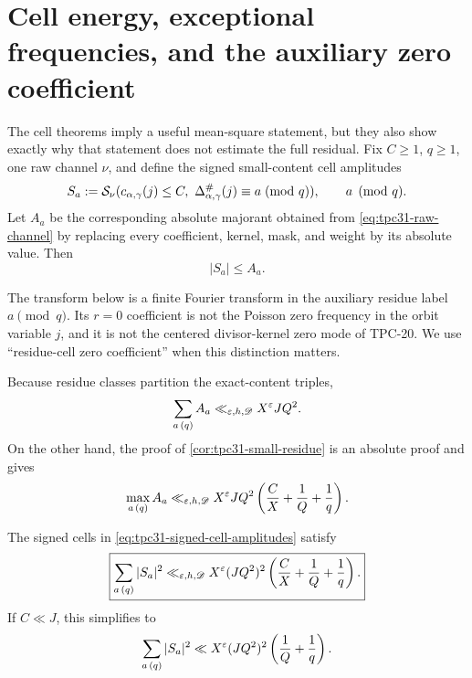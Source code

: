 \section{Cell energy, exceptional frequencies, and the auxiliary zero coefficient}
\label{sec:tpc31-zero-mode}

The cell theorems imply a useful mean-square statement, but they also
show exactly why that statement does not estimate the full residual.
Fix $C\ge1$, $q\ge1$, one raw channel $\nu$, and define the signed
small-content cell amplitudes
\begin{equation}
 S_a
 :=\mathcal S_\nu(c_{\alpha,\gamma}(j)\le C,
             \ \Delta^\#_{\alpha,\gamma}(j)
                  \equiv a\!\pmod q),
 \qquad a\pmod q.
 \label{eq:tpc31-signed-cell-amplitudes}
\end{equation}
Let $A_a$ be the corresponding absolute majorant obtained from
\eqref{eq:tpc31-raw-channel} by replacing every coefficient, kernel,
mask, and weight by its absolute value.  Then
\begin{equation}
 |S_a|\le A_a.
 \label{eq:tpc31-cell-majorization}
\end{equation}

\begin{remark}
\label{rem:tpc31-zero-mode-nomenclature}
The transform below is a finite Fourier transform in the auxiliary
residue label $a\pmod q$.  Its $r=0$ coefficient is not the Poisson
zero frequency in the orbit variable $j$, and it is not the centered
divisor-kernel zero mode of TPC-20.  We use ``residue-cell zero
coefficient'' when this distinction matters.
\end{remark}

Because residue classes partition the exact-content triples,
\begin{equation}
 \sum_{a\, (q)}A_a
 \ll_{\varepsilon,h,\mathscr D}X^\varepsilon JQ^2.
 \label{eq:tpc31-total-absolute-cell-mass}
\end{equation}
On the other hand, the proof of
\cref{cor:tpc31-small-residue} is an absolute proof and gives
\begin{equation}
 \max_{a\, (q)}A_a
 \ll_{\varepsilon,h,\mathscr D}X^\varepsilon JQ^2
 \left(\frac CX+\frac1Q+\frac1q\right).
 \label{eq:tpc31-maximum-cell-mass}
\end{equation}

\begin{proposition}
\label{prop:tpc31-cell-energy}
The signed cells in \eqref{eq:tpc31-signed-cell-amplitudes} satisfy
\begin{equation}
 \boxed{
 \sum_{a\, (q)}|S_a|^2
 \ll_{\varepsilon,h,\mathscr D}X^\varepsilon(JQ^2)^2
 \left(\frac CX+\frac1Q+\frac1q\right).}
 \label{eq:tpc31-cell-energy}
\end{equation}
If $C\ll J$, this simplifies to
\begin{equation}
 \sum_{a\, (q)}|S_a|^2
 \ll X^\varepsilon(JQ^2)^2
 \left(\frac1Q+\frac1q\right).
 \label{eq:tpc31-cell-energy-C-below-J}
\end{equation}
\end{proposition}

